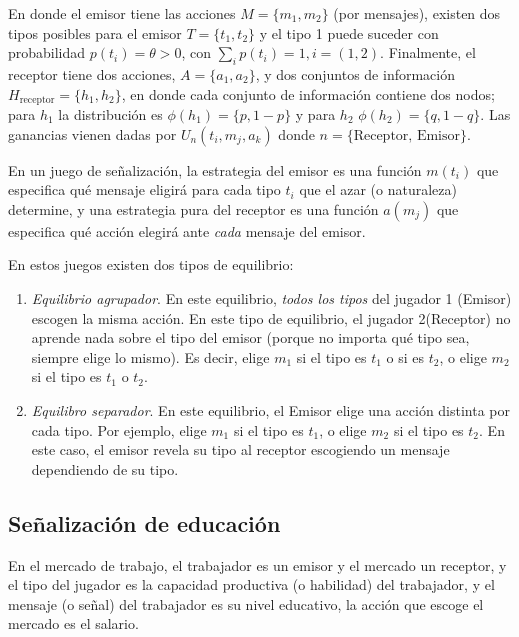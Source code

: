 \documentclass[12pt]{article}
\begin{document}
En donde el emisor tiene las acciones $ M = \{m_1, m_2\} $ (por mensajes), existen dos tipos posibles para el emisor $ T=\{t_1, t_2\} $ y el tipo 1 puede suceder con probabilidad $ p(t_i) = \theta >0 $, con $ \sum_i p(t_i) = 1, i = (1,2) $. Finalmente, el receptor tiene dos acciones, $ A=\{a_1, a_2\} $, y dos conjuntos de información $ H_{\text{receptor}} = \{h_1, h_2\} $, en donde cada conjunto de información contiene dos nodos; para $ h_1 $ la distribución es $ \phi(h_1) = \{p, 1-p\} $ y para $ h_2 $ $ \phi(h_2) = \{q, 1-q\} $. Las ganancias vienen dadas por $ U_{n}({t_i, m_j, a_k})$ donde $ n = \{\text{Receptor, Emisor}\} $.


En un juego de señalización, la estrategia del emisor es una función $ m(t_i) $ que especifica qué mensaje eligirá para cada tipo $ t_i $ que el azar (o naturaleza) determine, y una estrategia pura del receptor es una función $ a(m_j) $ que especifica qué acción elegirá ante \textit{cada} mensaje del emisor.

En estos juegos existen dos tipos de equilibrio:

\begin{enumerate}
	\setlength{\itemsep}{0pt}
	\setlength{\parskip}{0pt}
	\setlength{\parsep}{0pt}
	\item \textit{Equilibrio agrupador}. En este equilibrio, \textit{todos los tipos} del jugador 1 (Emisor) escogen la misma acción. En este tipo de equilibrio, el jugador 2(Receptor) no aprende nada sobre el tipo del emisor (porque no importa qué tipo sea, siempre elige lo mismo). Es decir, elige $ m_1 $ si el tipo es $ t_1 $ o si es $ t_2 $, o elige $ m_2 $ si el tipo es $ t_1 $ o $ t_2 $.
	\item \textit{Equilibro separador}. En este equilibrio, el Emisor elige una acción distinta por cada tipo. Por ejemplo, elige $ m_1 $ si el tipo es $ t_1 $, o elige $ m_2 $ si el tipo es $ t_2 $. En este caso, el emisor revela su tipo al receptor escogiendo un mensaje dependiendo de su tipo. 
\end{enumerate}

\subsection{Señalización de educación}

En el mercado de trabajo, el trabajador es un emisor y el mercado un receptor, y el tipo del jugador es la capacidad productiva (o habilidad) del trabajador, y el mensaje (o señal) del trabajador es su nivel educativo, la acción que escoge el mercado es el salario.
\end{document}
